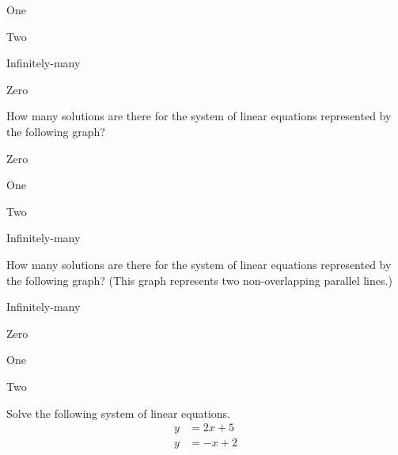 \begin{readinessAssuranceTest}
\begin{multicols}{4}
\begin{readinessAssuranceTestChoices}
\item One
\item Two
\item Infinitely-many %
\item Zero
\end{readinessAssuranceTestChoices}
\end{multicols}


\item How many solutions are there for the system of linear equations
      represented by the following graph?
    \begin{center}
      \systemWithOneSolutionA
    \end{center}

\begin{multicols}{4}
\begin{readinessAssuranceTestChoices}
\item Zero
\item One %
\item Two
\item Infinitely-many
\end{readinessAssuranceTestChoices}
\end{multicols}


\item How many solutions are there for the system of linear equations
      represented by the following graph? (This graph represents two
      non-overlapping parallel lines.)
    \begin{center}
      \systemWithNoSolutions
    \end{center}

\begin{multicols}{4}
\begin{readinessAssuranceTestChoices}
\item Infinitely-many
\item Zero %
\item One
\item Two
\end{readinessAssuranceTestChoices}
\end{multicols}


\item Solve the following system of linear equations.
      \begin{align*}
      y   &=   2x+5 \\
      y  &=  -x+2
      \end{align*}


\end{readinessAssuranceTest}
